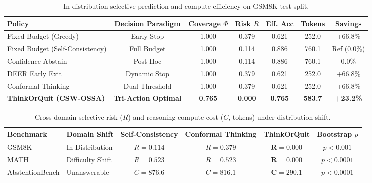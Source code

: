 \begin{table}[h]
\centering
\small
\begin{tabular}{lcccccc}
\hline
\textbf{Policy} & \textbf{Decision Paradigm} & \textbf{Coverage $\Phi$} & \textbf{Risk $R$} & \textbf{Eff. Acc} & \textbf{Tokens} & \textbf{Savings} \\
\hline
Fixed Budget (Greedy) & Early Stop & 1.000 & 0.379 & 0.621 & 252.0 & +66.8\% \\
Fixed Budget (Self-Consistency) & Full Budget & 1.000 & 0.114 & 0.886 & 760.1 & Ref (0.0\%) \\
Confidence Abstain & Post-Hoc & 1.000 & 0.114 & 0.886 & 760.1 & 0.0\% \\
DEER Early Exit & Dynamic Stop & 1.000 & 0.379 & 0.621 & 252.0 & +66.8\% \\
Conformal Thinking & Dual-Threshold & 1.000 & 0.379 & 0.621 & 252.0 & +66.8\% \\
\textbf{ThinkOrQuit (CSW-OSSA)} & \textbf{Tri-Action Optimal} & \textbf{0.765} & \textbf{0.000} & \textbf{0.765} & \textbf{583.7} & \textbf{+23.2\%} \\
\hline
\end{tabular}
\caption{In-distribution selective prediction and compute efficiency on GSM8K test split.}
\label{tab:main_results}
\end{table}

\begin{table}[h]
\centering
\small
\begin{tabular}{llcccc}
\hline
\textbf{Benchmark} & \textbf{Domain Shift} & \textbf{Self-Consistency} & \textbf{Conformal Thinking} & \textbf{ThinkOrQuit} & \textbf{Bootstrap $p$} \\
\hline
GSM8K & In-Distribution & $R=0.114$ & $R=0.379$ & $\mathbf{R=0.000}$ & $p < 0.001$ \\
MATH & Difficulty Shift & $R=0.523$ & $R=0.523$ & $\mathbf{R=0.000}$ & $p < 0.0001$ \\
AbstentionBench & Unanswerable & $C=876.6$ & $C=816.1$ & $\mathbf{C=290.1}$ & $p < 0.0001$ \\
\hline
\end{tabular}
\caption{Cross-domain selective risk ($R$) and reasoning compute cost ($C$, tokens) under distribution shift.}
\label{tab:shift_results}
\end{table}
